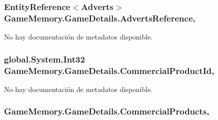 \hypertarget{class_game_memory_1_1_game_details_a52d3aaad97fc57c641ff37f552793da2}{
\subsubsection[{Adverts\-Reference}]{\setlength{\rightskip}{0pt plus 5cm}Entity\-Reference$<${\bf Adverts}$>$ Game\-Memory.\-Game\-Details.\-Adverts\-Reference\hspace{0.3cm}{\ttfamily [get]}, {\ttfamily [set]}}}\label{class_game_memory_1_1_game_details_a52d3aaad97fc57c641ff37f552793da2}


No hay documentación de metadatos disponible. 

\hypertarget{class_game_memory_1_1_game_details_a6fdd6c1a3a329df953a5c54a05c260b9}{
\subsubsection[{Commercial\-Product\-Id}]{\setlength{\rightskip}{0pt plus 5cm}global.\-System.\-Int32 Game\-Memory.\-Game\-Details.\-Commercial\-Product\-Id\hspace{0.3cm}{\ttfamily [get]}, {\ttfamily [set]}}}\label{class_game_memory_1_1_game_details_a6fdd6c1a3a329df953a5c54a05c260b9}


No hay documentación de metadatos disponible. 

\hypertarget{class_game_memory_1_1_game_details_a030903aaea05ae4b5ab820c6e8fa0fd0}{
\subsubsection[{Commercial\-Products}]{ Game\-Memory.\-Game\-Details.\-Commercial\-Products\hspace{0.3cm}{\ttfamily [get]}, {\ttfamily [set]}}}\label{class_game_memory_1_1_game_details_a030903aaea05ae4b5ab820c6e8fa0fd0}


